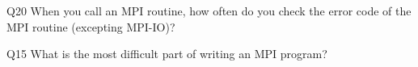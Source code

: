 \begin{description}%
\item{Q20} When you call an MPI routine, how often do you check the error code of the MPI routine  (excepting MPI-IO)?%
\item{Q15} What is the most difficult part of writing an MPI program?%
\end{description}%
